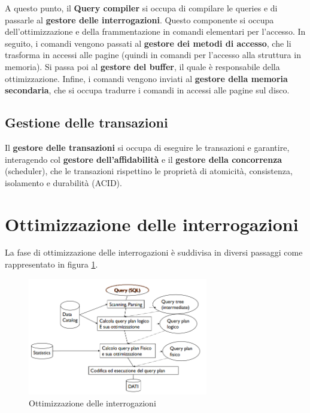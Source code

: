 A questo punto, il \textbf{Query compiler} si occupa di compilare le queries e di
passarle al \textbf{gestore delle interrogazioni}. Questo componente si occupa
dell'ottimizzazione e della frammentazione in comandi elementari per l'accesso.
In seguito, i comandi vengono passati al \textbf{gestore dei metodi di accesso},
che li trasforma in accessi alle pagine (quindi in comandi per l'accesso
alla struttura in memoria). Si passa poi al \textbf{gestore del buffer}, il quale
è responsabile della ottimizzazione. Infine, i comandi vengono inviati al
\textbf{gestore della memoria secondaria}, che si occupa tradurre i comandi in
accessi alle pagine sul disco.
\subsection{Gestione delle transazioni}
Il \textbf{gestore delle transazioni} si occupa di eseguire le transazioni e
garantire, interagendo col \textbf{gestore dell'affidabilità} e il \textbf{gestore
      della concorrenza} (scheduler), che le transazioni rispettino le proprietà
di atomicità, consistenza, isolamento e durabilità (ACID).
\section{Ottimizzazione delle interrogazioni}
La fase di ottimizzazione delle interrogazioni è suddivisa in diversi passaggi
come rappresentato in figura \ref{fig:Query_Optimization}.
\begin{figure}[!ht]
      \centering
      \includegraphics[width=0.7\textwidth]{./img/DBMS/Ottimizzazione_query.png}
      \caption{Ottimizzazione delle interrogazioni}
      \label{fig:Query_Optimization}
\end{figure}
